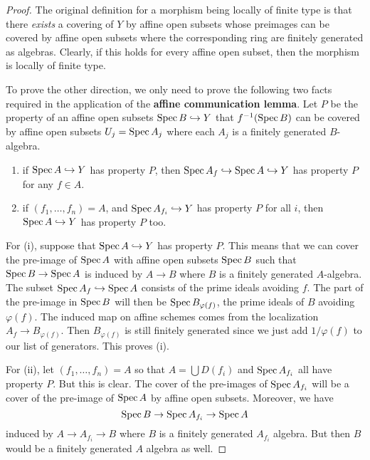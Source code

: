 \documentclass[]{pcmi}
\theoremstyle{plain}
\theoremstyle{definition}
\theoremstyle{remark}
\begin{document}
\begin{proof}
    The original definition for a morphism being locally of finite type is that there \emph{exists} a covering of $Y$ by affine open subsets whose preimages can be covered by affine open subsets where the corresponding ring are finitely generated as algebras. Clearly, if this holds for every affine open subset, then the morphism is locally of finite type. 

    To prove the other direction, we only need to prove the following two facts required in the application of the \textbf{affine communication lemma}. Let $P$ be the property of an affine open subsets $\operatorname{Spec} B \hookrightarrow Y$ that $f^{-1}(\operatorname{Spec} B)$ can be covered by affine open subsets $U_j = \operatorname{Spec} A_j$ where each $A_j$ is a finitely generated $B$-algebra. 
    \begin{enumerate}[label = (\roman*)]
        \item if $\operatorname{Spec} A \hookrightarrow Y$ has property $P$, then $\operatorname{Spec} A_f \hookrightarrow \operatorname{Spec} A \hookrightarrow Y$ has property $P$ for any $f \in A$. 
        \item if $(f_1, \ldots, f_n) = A$, and $\operatorname{Spec} A_{f_i} \hookrightarrow Y$ has property $P$ for all $i$, then $\operatorname{Spec} A \hookrightarrow Y$ has property $P$ too. 
    \end{enumerate}
    For (i), suppose that $\operatorname{Spec} A \hookrightarrow Y$ has property $P$. This means that we can cover the pre-image of $\operatorname{Spec} A$ with affine open subsets $\operatorname{Spec} B$ such that $\operatorname{Spec} B \to \operatorname{Spec} A$ is induced by $A \to B$ where $B$ is a finitely generated $A$-algebra. The subset $\operatorname{Spec} A_f \hookrightarrow \operatorname{Spec} A$ consists of the prime ideals avoiding $f$. The part of the pre-image in $\operatorname{Spec} B$ will then be $\operatorname{Spec} B_{\varphi(f)}$, the prime ideals of $B$ avoiding $\varphi(f)$. The induced map on affine schemes comes from the localization $A_f \to B_{\varphi(f)}$. Then $B_{\varphi(f)}$ is still finitely generated since we just add $1/\varphi(f)$ to our list of generators. This proves (i). 
    
    For (ii), let $(f_1, \ldots, f_n) = A$ so that $A = \bigcup D(f_i)$ and $\operatorname{Spec} A_{f_i}$ all have property $P$. But this is clear. The cover of the pre-images of $\operatorname{Spec} A_{f_i}$ will be a cover of the pre-image of $\operatorname{Spec} A$ by affine open subsets. Moreover, we have 
    \[
        \operatorname{Spec} B \to \operatorname{Spec} A_{f_i} \to \operatorname{Spec} A
    \]
    induced by $A \to A_{f_i} \to B$ where $B$ is a finitely generated $A_{f_i}$ algebra. But then $B$ would be a finitely generated $A$ algebra as well. 
    
\end{proof}
\end{document}
